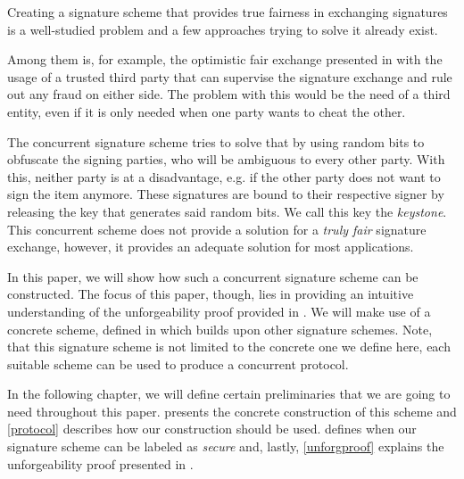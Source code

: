 Creating a signature scheme that provides true fairness in exchanging signatures is a well-studied problem and a few approaches trying to solve it already exist.

Among them is, for example, the optimistic fair exchange presented in \cite{asokan1998optimistic} with the usage of a trusted third party that can supervise the signature exchange and rule out any fraud on either side. 
The problem with this would be the need of a third entity, even if it is only needed when one party wants to cheat the other. 

The concurrent signature scheme \cite{chen2004concurrent} tries to solve that by using random bits to obfuscate the signing parties, who will be ambiguous to every other party.
With this, neither party is at a disadvantage, e.g. if the other party does not want to sign the item anymore.
These signatures are bound to their respective signer by releasing the key that generates said random bits.
We call this key the \textit{keystone}.
This concurrent scheme does not provide a solution for a \textit{truly fair} signature exchange, however, it provides an adequate solution for most applications.

In this paper, we will show how such a concurrent signature scheme can be constructed.
The focus of this paper, though, lies in providing an intuitive understanding of the unforgeability proof provided in \cite{chen2004concurrent}.
We will make use of a concrete scheme, defined in \cite{chen2004concurrent} which builds upon other signature schemes.
Note, that this signature scheme is not limited to the concrete one we define here, each suitable scheme can be used to produce a concurrent protocol.

In the following chapter, we will define certain preliminaries that we are going to need throughout this paper.
 presents the concrete construction of this scheme and \cref{protocol} describes how our construction should be used.
 defines when our signature scheme can be labeled as \textit{secure} and, lastly, \cref{unforgproof} explains the unforgeability proof presented in \cite{chen2004concurrent}.